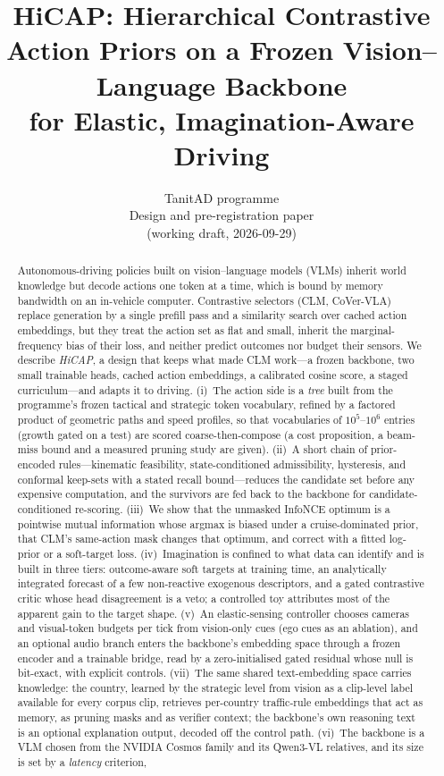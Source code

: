 \documentclass[10pt,a4paper]{article}
\title{\textbf{HiCAP: Hierarchical Contrastive Action Priors on a Frozen Vision--Language Backbone\\
for Elastic, Imagination-Aware Driving}}
\author{TanitAD programme \\ \small Design and pre-registration paper \\ \small (working draft, 2026-09-29)}
\date{}
\begin{document}
\maketitle

\begin{abstract}\noindent
Autonomous-driving policies built on vision--language models (VLMs) inherit world knowledge but decode actions
one token at a time, which is bound by memory bandwidth on an in-vehicle computer. Contrastive selectors (CLM, CoVer-VLA)
replace generation by a single prefill pass and a similarity search over cached action embeddings, but they treat the action set
as flat and small, inherit the marginal-frequency bias of their loss, and neither predict outcomes nor budget their sensors.
We describe \emph{HiCAP}, a design that keeps what made CLM work---a frozen backbone, two small trainable heads, cached action
embeddings, a calibrated cosine score, a staged curriculum---and adapts it to driving. (i)~The action side is a \emph{tree}
built from the programme's frozen tactical and strategic token vocabulary, refined by a factored product of geometric paths and speed profiles, so that vocabularies of $10^{5}$--$10^{6}$ entries (growth gated on a test) are scored
coarse-then-compose (a cost proposition, a beam-miss bound and a measured pruning study are given). (ii)~A short chain of prior-encoded rules---kinematic
feasibility, state-conditioned admissibility, hysteresis, and conformal keep-sets with a stated recall bound---reduces the candidate set
before any expensive computation, and the survivors are fed back to the backbone for candidate-conditioned re-scoring.
(iii)~We show that the unmasked InfoNCE optimum is a pointwise mutual information whose argmax is biased under a cruise-dominated prior, that CLM's same-action mask changes that optimum, and
correct with a fitted log-prior or a soft-target loss. (iv)~Imagination is confined to what data can identify and is built in three tiers: outcome-aware soft targets at training time, an analytically integrated forecast of a few non-reactive exogenous descriptors, and a gated contrastive critic whose head disagreement is a veto; a controlled toy attributes most of the apparent gain to the target shape.
(v)~An elastic-sensing controller chooses cameras and visual-token budgets per tick from vision-only cues (ego cues as an ablation), and an optional audio branch
enters the backbone's embedding space through a frozen encoder and a trainable bridge, read by a zero-initialised gated residual whose null is bit-exact, with explicit controls. (vii)~The same shared text-embedding space carries knowledge: the country, learned by the strategic level from vision as a clip-level label available for every corpus clip, retrieves per-country traffic-rule embeddings that act as memory, as pruning masks and as verifier context; the backbone's own reasoning text is an optional explanation output, decoded off the control path. (vi)~The backbone is a VLM chosen from the NVIDIA Cosmos family and its Qwen3-VL relatives, and its size is set by a \emph{latency} criterion,

\end{abstract}
\end{document}

